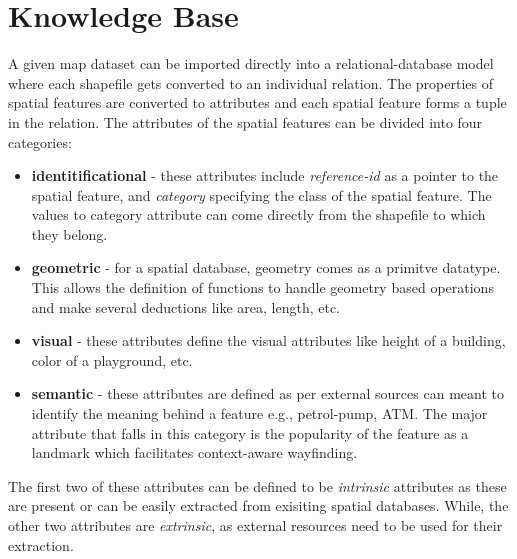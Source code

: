 \documentclass{iitkthesis}
\begin{document}
 \section{Knowledge Base}
  \label{sec:kbase}
A given map dataset can be imported directly into a relational-database model where each shapefile gets converted to an individual relation. The properties of spatial features are converted to attributes and each spatial feature forms a tuple in the relation. The attributes of the spatial features can be divided into four categories:
\begin{itemize}
  \item \textbf{identitificational} - these attributes include \textit{reference-id} as a pointer to the spatial feature, and \textit{category} specifying the class of the spatial feature. The values to category attribute can come directly from the shapefile to which they belong.
  \item \textbf{geometric} - for a spatial database, geometry comes as a primitve datatype. This allows the definition of functions to handle geometry based operations and make several deductions like area, length, etc.
  \item \textbf{visual} -  these attributes define the visual attributes like height of a building, color of a playground, etc.
  \item \textbf{semantic} - these attributes are defined as per external sources can meant to identify the meaning behind a feature e.g., petrol-pump, ATM.  The major attribute that falls in this category is the popularity of the feature as a landmark which facilitates context-aware wayfinding.
\end{itemize}

The first two of these attributes can be defined to be \textit{intrinsic} attributes as these are present or can be easily extracted from exisiting spatial databases. While, the other two attributes are \textit{extrinsic}, as external resources need to be used for their extraction.
\end{document}
